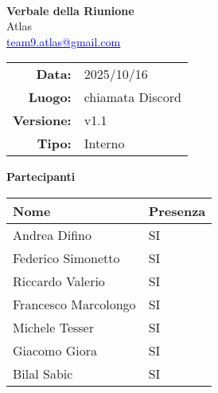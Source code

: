 \documentclass[a4paper,12pt]{article}
\makeatletter
\newcommand{\Gruppo}{Atlas}
\newcommand{\Email}{\href{mailto:team9.atlas@gmail.com}{\textcolor{blue}{\underline{team9.atlas@gmail.com}}}}
\newcommand{\TitoloVerbale}{Verbale della Riunione}
\newcommand{\DataVerbale}{2025/10/16}
\newcommand{\LuogoVerbale}{chiamata Discord}
\newcommand{\LogoGruppo}{img/AtlasLogo.png} %
\newcommand{\VersioneVerbale}{v1.1} %
\newcommand{\VerbaleInterno}{Interno}
\makeatother
\begin{document}
\begin{titlepage}
    \centering

    \vspace*{0cm}
    \\
    [.5cm]
    {\Huge \textbf{\TitoloVerbale}}\\[0.8cm]
    {\LARGE \Gruppo}\\[0.1cm]
    {\Email}\\[1.2cm]

    \begin{tabular}{rl}
        \textbf{Data:} & \DataVerbale \\
        \textbf{Luogo:} & \LuogoVerbale \\
        \textbf{Versione:} & \VersioneVerbale \\
        \textbf{Tipo:} & \VerbaleInterno \\
    \end{tabular}

    \vspace{1.2cm}

    {\large \textbf{Partecipanti}}\\[0.5cm]
    \begin{tabular}{l|l}
        \textbf{Nome} & \textbf{Presenza} \\
        \hline
        Andrea Difino & SI \\
        Federico Simonetto & SI \\
        Riccardo Valerio & SI \\
        Francesco Marcolongo & SI \\
        Michele Tesser & SI \\
        Giacomo Giora & SI \\
        Bilal Sabic & SI \\
    \end{tabular}

\end{titlepage}
\end{document}
